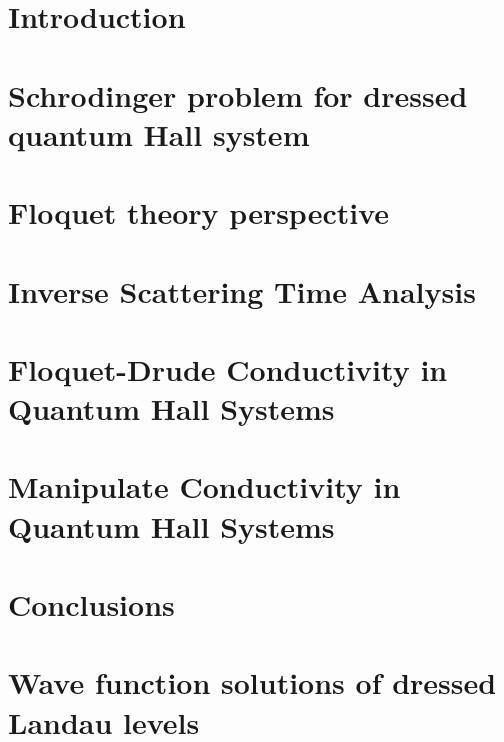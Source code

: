 \documentclass[%
 reprint,
 amsmath,amssymb,
 aps,
prb,
]{revtex4-2}
\begin{document}
\section{\label{sec_introduction} Introduction}


\section{\label{sec_schrodinger_problem} Schrodinger problem for dressed quantum Hall system}


\section{\label{sec_floquet_theory} Floquet theory perspective}


\section{\label{sec_inverse_scattering_time}  Inverse Scattering Time Analysis}


\section{\label{sec_floquet_drude_conductivity} Floquet-Drude Conductivity in Quantum Hall Systems}


\section{\label{sec_manipulate_conductivity} Manipulate Conductivity in Quantum Hall Systems}


\section{\label{sec_conclusions} Conclusions}


\begin{acknowledgments}

\end{acknowledgments}

\appendix

\section{\label{appendix_a} Wave function solutions of dressed Landau levels}

\end{document}
